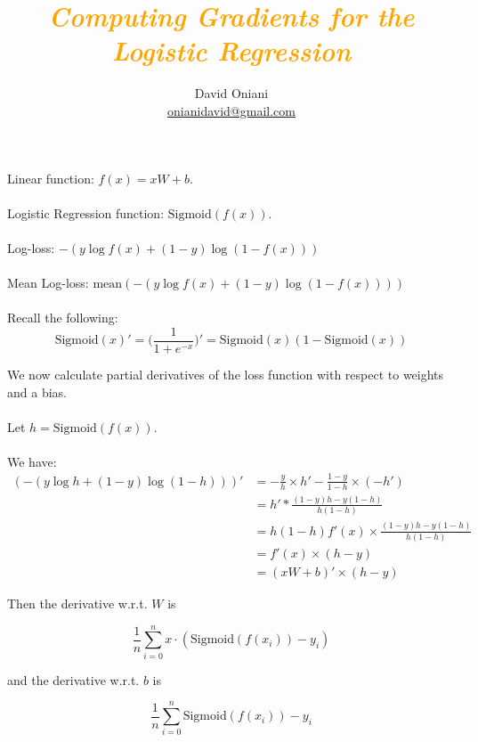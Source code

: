\documentclass[12pt]{article}
\author{David Oniani\\
        \href{mailto:onianidavid@gmail.com}{onianidavid@gmail.com}}
\title{\textcolor{orange}{\textit{Computing Gradients for the Logistic Regression}}}
\date{}
\begin{document}
\maketitle


Linear function: \(f(x) = xW + b\).
\\\\
Logistic Regression function: \(\text{Sigmoid}(f(x))\).
\\\\
Log-loss: \(-(y\log{f(x)} + (1 - y)\log{(1 - f(x))})\)
\\\\
Mean Log-loss: \(\text{mean}(-(y\log{f(x)} + (1 - y)\log{(1 - f(x))}))\)
\\\\
Recall the following:
\begin{equation}
    \text{Sigmoid}(x)' = \Big(\dfrac{1}{1 + e^{-x}}\Big)' = \text{Sigmoid}(x)(1 - \text{Sigmoid}(x))
\end{equation}

We now calculate partial derivatives of the loss function with respect to weights and a bias.
\\\\
Let $h = \text{Sigmoid}(f(x))$.
\\\\
We have:
\begin{align}
    (-(y\log{h} + (1 - y)\log{(1 - h)}))' &= -\frac{y}{h} \times h' - \frac{1 - y}{1 - h} \times (-h')\\
                                          &= h'* \frac{(1 - y)h - y(1 - h)}{h(1 - h)}\\
                                          &= h(1 - h)f'(x) \times \frac{(1 - y)h - y(1 - h)}{h(1 - h)}\\
                                          &= f'(x) \times (h - y)\\
                                          &= (xW + b)' \times (h - y)
\end{align}

Then the derivative w.r.t. $W$ is

\begin{equation}
    \boxed{\frac{1}{n} \sum_{i = 0}^n x \cdot (\text{Sigmoid}(f(x_i)) - y_i)}
\end{equation}

and the derivative w.r.t. $b$ is

\begin{equation}
    \boxed{\frac{1}{n} \sum_{i = 0}^n \text{Sigmoid}(f(x_i)) - y_i}
\end{equation}

\end{document}
